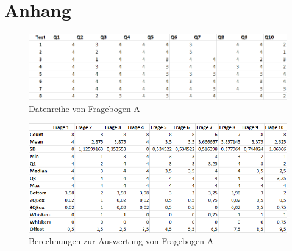 \chapter{Anhang}
\label{appedixa}
\begin{figure}[h]
	\centering
		\includegraphics[width=1.00\textwidth]{media/tableData.png}
	\caption{Datenreihe von Fragebogen A}
	\label{fig:tableData}
\end{figure}

\begin{figure}[h]
	\centering
		\includegraphics[width=1.00\textwidth]{media/excel_calculation.png}
	\caption{Berechnungen zur Auswertung von Fragebogen A}
	\label{fig:excel_calculation}
\end{figure}


\clearpage




